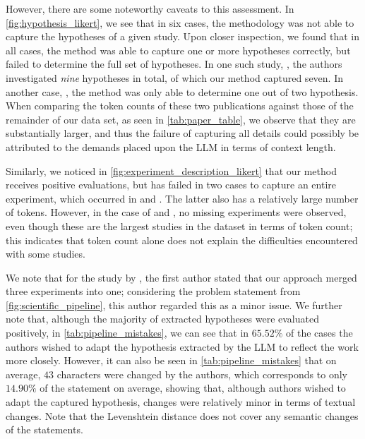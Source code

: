 \documentclass[letterpaper]{article} %
\newcommand{\nbc}[3]{
{\colorbox{#3}{\bfseries\sffamily\scriptsize\textcolor{white}{#1}}}
{\textcolor{#3}{\sf\small$\blacktriangleright$\textit{#2}$\blacktriangleleft$}}
}
\newcommand{\hh}[1]{\nbc{HH}{#1}{red}}
\begin{document}
However, there are some noteworthy caveats to this assessment. In \autoref{fig:hypothesis_likert}, we see that in six cases, the methodology was not able to capture the hypotheses of a given study. 
Upon closer inspection, we found that in all cases, the method was able to capture one or more hypotheses correctly, but failed to determine the full set of hypotheses. 
In one such study, \citet{BosEtAl25}, the authors investigated \emph{nine} hypotheses in total, of which our method captured seven. 
In another case, \citet{benjamins2025carpsframeworkcomparingn}, the method was only able to determine one out of two hypothesis. 
When comparing the token counts of these two publications against those of the remainder of our data set, as seen in \autoref{tab:paper_table}, we observe that they are substantially larger, and thus the failure of capturing all details could possibly be attributed to the demands placed upon the LLM in terms of context length. 

Similarly, we noticed in \autoref{fig:experiment_description_likert} that our method receives positive evaluations, but has failed in two cases to capture an entire experiment, which occurred in \citet{benjamins2025carpsframeworkcomparingn} and \citet{BerEtAl25}. The latter also has a relatively large number of tokens. However, in the case of \citet{SkaEtAl25} and \citet{eimer2023hyperparameters}, no missing experiments were observed, even though these are the largest studies in the dataset in terms of token count; this indicates that token count alone does not explain the difficulties encountered with some studies. 

We note that for the study by \citet{eimer2023hyperparameters}, the first author stated that our approach merged three experiments into one; considering the problem statement from \autoref{fig:scientific_pipeline}, this author regarded this as a minor issue. 
We further note that, although the majority of extracted hypotheses were evaluated positively, in \autoref{tab:pipeline_mistakes}, we can see that in $65.52\%$ of the cases the authors wished to adapt the hypothesis extracted by the LLM to reflect the work more closely. However, it can also be seen in \autoref{tab:pipeline_mistakes} that on average, $43$ characters were changed by the authors, which corresponds to only $14.90\%$ of the statement on average, showing that, although authors wished to adapt the captured hypothesis, changes were relatively minor in terms of textual changes. Note that the Levenshtein distance does not cover any semantic changes of the statements.
\end{document}
